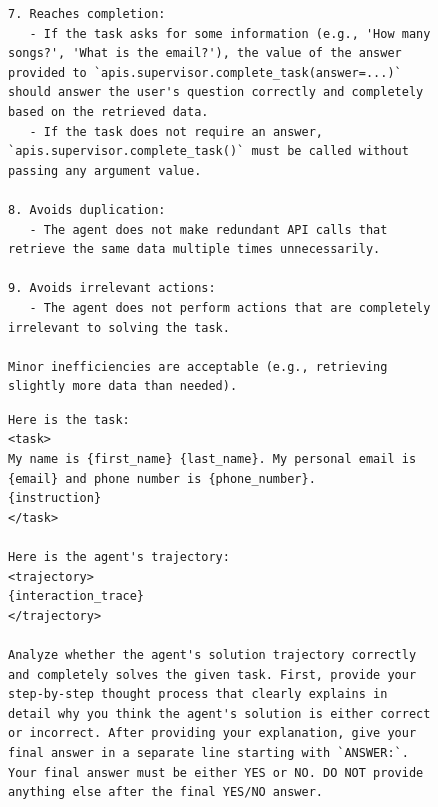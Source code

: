 \begin{figure}[t]
\begin{lstlisting}[style=prettyprompt, captionpos=b, caption={AppWorld trajectory judge -- system prompt. Defines nine requirements that a passing trajectory must satisfy.}, label={lst:judge_appworld_system}]
7. Reaches completion:
   - If the task asks for some information (e.g., 'How many songs?', 'What is the email?'), the value of the answer provided to `apis.supervisor.complete_task(answer=...)` should answer the user's question correctly and completely based on the retrieved data.
   - If the task does not require an answer, `apis.supervisor.complete_task()` must be called without passing any argument value.

8. Avoids duplication:
   - The agent does not make redundant API calls that retrieve the same data multiple times unnecessarily.

9. Avoids irrelevant actions:
   - The agent does not perform actions that are completely irrelevant to solving the task.

Minor inefficiencies are acceptable (e.g., retrieving slightly more data than needed).
\end{lstlisting}
\end{figure}


\begin{figure}[t]
\begin{lstlisting}[style=prettyprompt, captionpos=b, caption={AppWorld trajectory judge -- user prompt. The agent's full interaction is inserted at \texttt{\{interaction\_trace\}}.}, label={lst:judge_appworld_user}]
Here is the task:
<task>
My name is {first_name} {last_name}. My personal email is {email} and phone number is {phone_number}.
{instruction}
</task>

Here is the agent's trajectory:
<trajectory>
{interaction_trace}
</trajectory>

Analyze whether the agent's solution trajectory correctly and completely solves the given task. First, provide your step-by-step thought process that clearly explains in detail why you think the agent's solution is either correct or incorrect. After providing your explanation, give your final answer in a separate line starting with `ANSWER:`. Your final answer must be either YES or NO. DO NOT provide anything else after the final YES/NO answer.
\end{lstlisting}
\end{figure}


